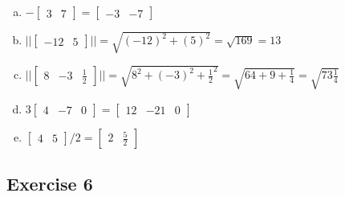 \documentclass[11pt]{article}
\begin{document}
\begin{enumerate}[a.]
	\item %
$
-\begin{bmatrix}
3 & 7
\end{bmatrix}
=
\begin{bmatrix}
-3 & -7
\end{bmatrix}
$
	\item %
$
||
\begin{bmatrix}
-12 & 5
\end{bmatrix}
|| = 
\sqrt{(-12)^2+(5)^2}=\sqrt{169}=13
$
	\item %
$
||
\begin{bmatrix}
8 & -3 & \frac{1}{2}
\end{bmatrix}
|| = 
\sqrt{8^2+(-3)^2+\frac{1}{2}^2} =
\sqrt{64 + 9 + \frac{1}{4}} = \sqrt{73\frac{1}{4}}
$
	\item %
$
3\begin{bmatrix}
4 & -7 & 0
\end{bmatrix}
=
\begin{bmatrix}
12 & -21 & 0
\end{bmatrix}
$
	\item %
$
\begin{bmatrix}
4 & 5
\end{bmatrix}/2
=
\begin{bmatrix}
2 & \frac{5}{2}
\end{bmatrix}
$
\end{enumerate}

\subsection{Exercise 6}
\end{document}
